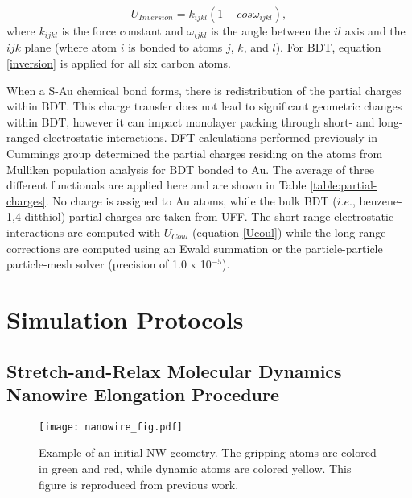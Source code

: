 \documentclass[10pt]{report}  %
\begin{document}
\begin{equation} U_{Inversion} = k_{ijkl}\left(1-cos\omega_{ijkl}\right),\label{inversion}\end{equation} where $k_{ijkl}$ is the force constant and $\omega_{ijkl}$ is the angle between the $il$ axis and the $ijk$ plane (where atom $i$ is bonded to atoms $j$, $k$, and $l$). For BDT, equation \ref{inversion} is applied for all six carbon atoms.  



When a S-Au chemical bond forms, there is redistribution of the partial charges within BDT. \cite{Leng:2005} This charge transfer does not lead to significant geometric changes within BDT, however it can impact monolayer packing through short- and long-ranged electrostatic interactions. DFT calculations performed previously in Cummings group \cite{Leng:2005} determined the partial charges residing on the atoms from Mulliken population analysis\cite{Mulliken:1962} for BDT bonded to Au. The average of three different functionals are applied here and are shown in Table \ref{table:partial-charges}. No charge is assigned to Au atoms, while the bulk BDT ($i.e.$, benzene-1,4-ditthiol) partial charges are taken from UFF. \cite{Rappe:1992} The short-range electrostatic interactions are computed with $U_{Coul}$ (equation \ref{Ucoul}) while the long-range corrections are computed using an Ewald summation or the particle-particle particle-mesh solver (precision of 1.0 x 10$^{-5}$).

\section{Simulation Protocols}

\subsection{Stretch-and-Relax Molecular Dynamics Nanowire Elongation Procedure}

%
%
\begin{figure}[b]
       \centering
	\texttt{[image: nanowire\_fig.pdf]}
	\caption{Example of an initial NW geometry. The gripping atoms are colored in green and red, while dynamic atoms are colored yellow. This figure is reproduced from previous work. \protect\cite{Iacovella_scidac:2011}}
	\label{fig:nanowire-schematic}
\end{figure}
\end{document}
